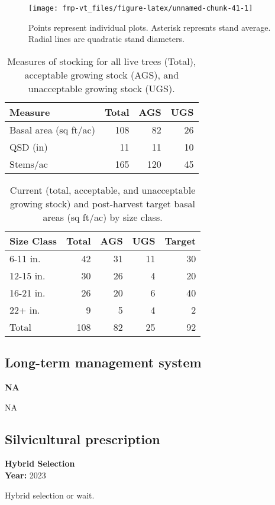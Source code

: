 \documentclass[]{tufte-handout}
\begin{document}
\begin{figure}
\texttt{[image: fmp-vt\_files/figure-latex/unnamed-chunk-41-1]} \caption[Points represent individual plots]{Points represent individual plots. Asterisk represnts stand average. Radial lines are quadratic stand diameters.}\label{fig:unnamed-chunk-41}
\end{figure}

\begin{table}

\caption{\label{tab:unnamed-chunk-42}Measures of stocking for all live trees (Total), acceptable growing stock (AGS), and unacceptable growing stock (UGS).}
\centering
\begin{tabular}[t]{lrrr}
\toprule
Measure & Total & AGS & UGS\\
\midrule
Basal area (sq ft/ac) & 108 & 82 & 26\\
QSD (in) & 11 & 11 & 10\\
Stems/ac & 165 & 120 & 45\\
\bottomrule
\end{tabular}
\end{table}

\begin{table}

\caption{\label{tab:unnamed-chunk-43}Current (total, acceptable, and unacceptable growing stock) and post-harvest target basal areas (sq ft/ac) by size class.}
\centering
\begin{tabular}[t]{lrrrr}
\toprule
Size Class & Total & AGS & UGS & Target\\
\midrule
6-11 in. & 42 & 31 & 11 & 30\\
12-15 in. & 30 & 26 & 4 & 20\\
16-21 in. & 26 & 20 & 6 & 40\\
22+ in. & 9 & 5 & 4 & 2\\
Total & 108 & 82 & 25 & 92\\
\bottomrule
\end{tabular}
\end{table}

\subsection{Long-term management
system}\label{long-term-management-system-6}

\textbf{NA}

NA

\subsection{Silvicultural
prescription}\label{silvicultural-prescription-6}

\textbf{Hybrid Selection}\\
\noindent \textbf{Year:} 2023

Hybrid selection or wait.

\newpage
\end{document}
